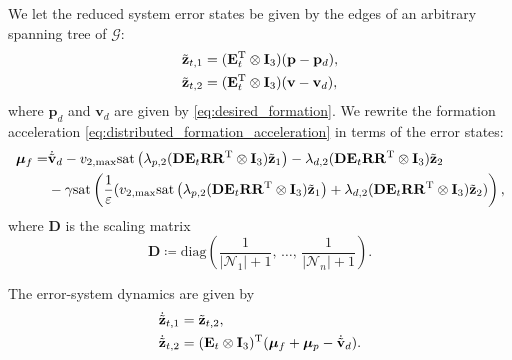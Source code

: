 We let the reduced system error states be given by the edges of an arbitrary spanning tree of $\mathcal{G}$:
\begin{subequations}
\begin{align}
    \tilde{\mathbf{z}}_{t,1} &= (\mathbf{E}_t^{\rm T}\otimes \mathbf{I}_3)(\mathbf{p}-\mathbf{p}_d),\label{eq:z_t1_def}\\
    \tilde{\mathbf{z}}_{t,2} &= (\mathbf{E}_t^{\rm T}\otimes \mathbf{I}_3) (\mathbf{v} - \mathbf{v}_d),
\end{align}
\end{subequations}
where $\mathbf{p}_d$ and $\mathbf{v}_d$ are given by \eqref{eq:desired_formation}. We rewrite the formation acceleration \eqref{eq:distributed_formation_acceleration} in terms of the error states:
\begin{equation}\label{eq:mu_f_z}
    \begin{split}
        \bm{\mu}_f  = &\dot{\Tilde{\mathbf{v}}}_{d}- v_{2,\max} \mathrm{sat}\left(\lambda_{p,2}(\mathbf{D}\mathbf{E}_t\mathbf{R}\mathbf{R}^{\rm T}\otimes \mathbf{I}_3)\tilde{\mathbf{z}}_1\right) -
        \lambda_{d,2}(\mathbf{D}\mathbf{E}_t\mathbf{R}\mathbf{R}^{\rm T}\otimes \mathbf{I}_3)\tilde{\mathbf{z}}_2\\
        &-\gamma \mathrm{sat}\left(\frac{1}{\varepsilon}(v_{2,\max} \mathrm{sat}\left(\lambda_{p,2}(\mathbf{D}\mathbf{E}_t\mathbf{R}\mathbf{R}^{\rm T}\otimes \mathbf{I}_3)\tilde{\mathbf{z}}_1\right)
        + \lambda_{d,2}(\mathbf{D}\mathbf{E}_t\mathbf{R}\mathbf{R}^{\rm T}\otimes \mathbf{I}_3)\tilde{\mathbf{z}}_2)\right),
    \end{split}
\end{equation}
where $\mathbf{D}$ is the scaling matrix
\begin{equation}
    \mathbf{D} \coloneqq \mathrm{diag}\left(\frac{1}{|\mathcal{N}_1|+1},\, \ldots, \,\frac{1}{|\mathcal{N}_n|+1}\right).
\end{equation}

The error-system dynamics are given by
\begin{subequations}\label{eq:distributed_formation_error_system}
    \begin{align}
        \dot{\tilde{\mathbf{z}}}_{t,1} &= \tilde{\mathbf{z}}_{t,2},\label{eq:distributed_formation_error_subsystem_1}\\
        \dot{\tilde{\mathbf{z}}}_{t,2} &= (\mathbf{E}_t\otimes \mathbf{I}_3)^{\rm T} (\bm{\mu}_f + \bm{\mu}_p - \dot{\tilde{\mathbf{v}}}_d).
    \end{align}
\end{subequations}

